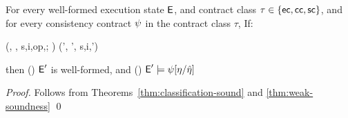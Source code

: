\begin{corollary}[Soundness]
\label{thm:soundness}
For every well-formed execution state ${\normalfont \textsf{E}}$, and contract class $\tau
\in \{{\sf ec},{\sf cc},{\sf sc}\}$, and for every consistency
contract $\psi$ in the contract class $\tau$, If:
\begin{smathpar}
(\E, \Theta, \langle s,i,\langle op,\tau \rangle;
\sigma \rangle \pll \Sigma) \xrightarrow{\eff} (\E', \Theta',
\langle s,i,\sigma \rangle \pll \Sigma')
\end{smathpar}
then () ${\normalfont \textsf{E}}'$ is well-formed, and ()
${\normalfont \textsf{E}}' \models \psi[\eta/\hat{\eta}]$
\end{corollary}
\begin{proof}
Follows from Theorems~\ref{thm:classification-sound} and
\ref{thm:weak-soundness}
\qed
\end{proof}
